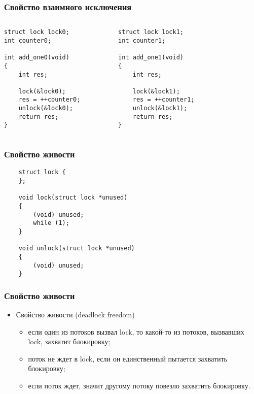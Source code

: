 \begin{frame}[fragile]
\frametitle{Свойство взаимного исключения}
\begin{columns}
    \begin{column}{.4\textwidth}
        \begin{lstlisting}
struct lock lock0;
int counter0;

int add_one0(void)
{
    int res;

    lock(&lock0);
    res = ++counter0;
    unlock(&lock0);
    return res;
}
        \end{lstlisting}
    \end{column}
    \begin{column}{.4\textwidth}
        \begin{lstlisting}
struct lock lock1;
int counter1;

int add_one1(void)
{
    int res;

    lock(&lock1);
    res = ++counter1;
    unlock(&lock1);
    return res;
}
        \end{lstlisting}
    \end{column}
    \begin{column}{.2\textwidth}
    \end{column}
\end{columns}
\end{frame}

\begin{frame}[fragile]
\frametitle{Свойство живости}
\begin{lstlisting}
    struct lock {
    };

    void lock(struct lock *unused)
    {
        (void) unused;
        while (1);
    }

    void unlock(struct lock *unused)
    {
        (void) unused;
    }
\end{lstlisting}
\end{frame}

\begin{frame}
\frametitle{Свойство живости}
\begin{itemize}
    \item<1->Свойство живости (deadlock freedom)
    \begin{itemize}
        \item<2->если один из потоков вызвал lock, то какой-то из
             потоков, вызвавших lock, захватит блокировку;
        \item<3->поток не ждет в lock, если он единственный пытается захватить
             блокировку;
        \item<4->если поток ждет, значит другому потоку повезло захватить
             блокировку.
    \end{itemize}
\end{itemize}
\end{frame}

